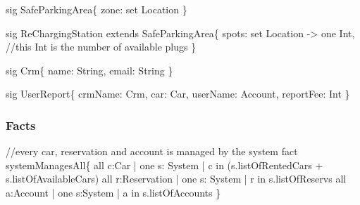 \documentclass[a4paper]{article}
\begin{document}
sig SafeParkingArea\{ \newline
\hspace*{5 mm}	zone: set Location  \newline
\} \newline
 
sig ReChargingStation extends SafeParkingArea\{ \newline
\hspace*{5 mm}	spots: set Location -> one Int, //this Int is the number of available plugs \newline
\} \newline

sig Crm\{ \newline
\hspace*{5 mm}	name: String, \newline
\hspace*{5 mm}	email: String \newline
\} \newline

sig UserReport\{ \newline
\hspace*{5 mm}	crmName: Crm, \newline
\hspace*{5 mm}	car: Car, \newline
\hspace*{5 mm}	userName: Account, \newline
\hspace*{5 mm}	reportFee: Int \newline
\} \newline

\subsubsection{Facts}
 
//every car, reservation and account is managed by the system \newline
fact systemManagesAll\{ \newline
\hspace*{5 mm}	all c:Car | one s: System | c in (s.listOfRentedCars + s.listOfAvailableCars) \newline
\hspace*{5 mm}	all r:Reservation | one s: System | r in s.listOfReservs \newline
\hspace*{5 mm}	all a:Account | one s:System | a in s.listOfAccounts \newline
\} \newline
\end{document}
